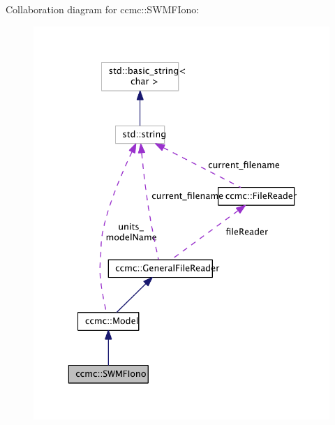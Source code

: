 Collaboration diagram for ccmc\-:\-:S\-W\-M\-F\-Iono\-:\nopagebreak
\begin{figure}[H]
\begin{center}
\leavevmode
\includegraphics[width=336pt]{classccmc_1_1_s_w_m_f_iono__coll__graph}
\end{center}
\end{figure}
